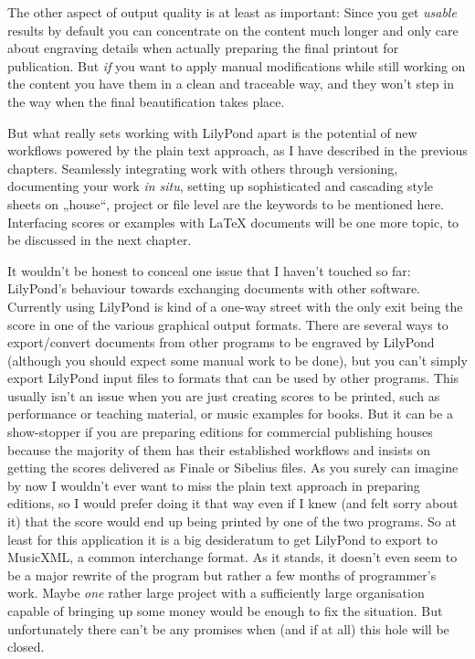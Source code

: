 \documentclass[DIV=12]{scrreprt}
\begin{document}
The other aspect of output quality is at least as important:
Since you get \emph{usable} results by default you can concentrate on the content much longer and only care about engraving details when actually preparing the final printout for publication.
But \emph{if} you want to apply manual modifications while still working on the content you have them in a clean and traceable way, and they won't step in the way when the final beautification takes place.

But what really sets working with LilyPond apart is the potential of new workflows powered by the plain text approach, as I have described in the previous chapters.
Seamlessly integrating work with others through versioning, documenting your work \emph{in situ}, setting up sophisticated and cascading style sheets on „house“, project or file level are the keywords to be mentioned here.
Interfacing scores or examples with \LaTeX{} documents will be one more topic, to be discussed in the next chapter.

\medskip
It wouldn't be honest to conceal one issue that I haven't touched so far: LilyPond's behaviour towards exchanging documents with other software.
Currently using LilyPond is kind of a one-way street with the only exit being the score in one of the various graphical output formats.
There are several ways to export/convert documents from other programs to be engraved by LilyPond (although you should expect some manual work to be done), but you can't simply export LilyPond input files to formats that can be used by other programs.
This usually isn't an issue when you are just creating scores to be printed, such as performance or teaching material, or music examples for books.
But it can be a show-stopper if you are preparing editions for commercial publishing houses because the majority of them has their established workflows and insists on getting the scores delivered as Finale\texttrademark{} or Sibelius\texttrademark{} files.
As you surely can imagine by now I wouldn't ever want to miss the plain text approach in preparing editions, so I would prefer doing it that way even if I knew (and felt sorry about it) that the score would end up being printed by one of the two programs.
So at least for this application it is a big desideratum to get LilyPond to export to MusicXML, a common interchange format.
As it stands, it doesn't even seem to be a major rewrite of the program but rather a few months of programmer's work.
Maybe \emph{one} rather large project with a sufficiently large organisation capable of bringing up some money would be enough to fix the situation.
But unfortunately there can't be any promises when (and if at all) this hole will be closed.
\end{document}
